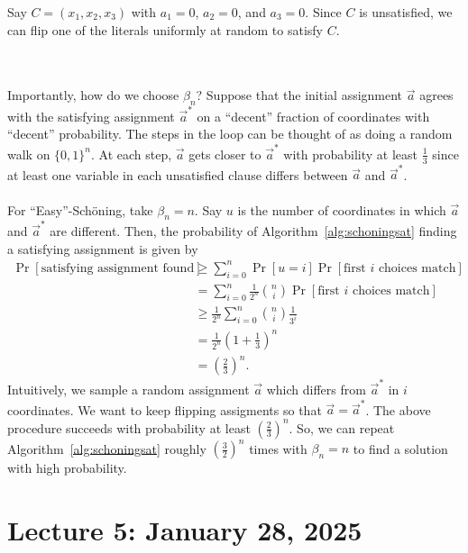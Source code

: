         \begin{example}
            Say \(C=(x_1,x_2,x_3)\) with \(a_1=0\), \(a_2=0\), and \(a_3=0\). Since \(C\) is unsatisfied, we can flip one of the literals uniformly at random to satisfy \(C\).
        \end{example}
        \vphantom
        \\
        \\
        Importantly, how do we choose \(\beta_n\)? Suppose that the initial assignment \(\vec{a}\) agrees with the satisfying assignment \(\vec{a}^*\) on a ``decent'' fraction of coordinates with ``decent'' probability. The steps in the loop can be thought of as doing a random walk on \(\{0,1\}^n\). At each step, \(\vec{a}\) gets closer to \(\vec{a}^*\) with probability at least \(\frac{1}{3}\) since at least one variable in each unsatisfied clause differs between \(\vec{a}\) and \(\vec{a}^*\). 
        \pagebreak
        \vphantom
        \\
        \\
        For ``Easy''-Sch\"oning, take \(\beta_n=n\). Say \(u\) is the number of coordinates in which \(\vec{a}\) and \(\vec{a}^*\) are different. Then, the probability of Algorithm~\ref{alg:schoningsat} finding a satisfying assignment is given by
        \begin{align*}
            \Pr[\text{satisfying assignment found}]&\geq \sum_{i=0}^n \Pr[u=i]\Pr[\text{first }i\text{ choices match}] \\
            &=\sum_{i=0}^n \frac{1}{2^n}\binom{n}{i}\Pr[\text{first }i\text{ choices match}] \\
            &\geq\frac{1}{2^n}\sum_{i=0}^n\binom{n}{i}\frac{1}{3^i} \\
            &=\frac{1}{2^n}\left(1+\frac{1}{3}\right)^n \\
            &=\left(\frac{2}{3}\right)^n.
        \end{align*}
        Intuitively, we sample a random assignment \(\vec{a}\) which differs from \(\vec{a}^*\) in \(i\) coordinates. We want to keep flipping assigments so that \(\vec{a}=\vec{a}^*\). The above procedure succeeds with probability at least \(\left(\frac{2}{3}\right)^n\). So, we can repeat Algorithm~\ref{alg:schoningsat} roughly \(\left(\frac{3}{2}\right)^n\) times with \(\beta_n=n\) to find a solution with high probability.

\pagebreak

\section{Lecture 5: January 28, 2025}

